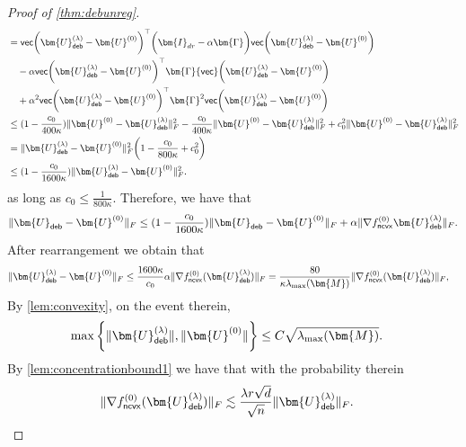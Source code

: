 \documentclass[10pt]{article}
\renewcommand{\t}{^{\top}}
\theoremstyle{definition}
\begin{document}
\begin{proof}[Proof of \cref{thm:debunreg}]
\begin{align}
    &= {\sf vec} \bigg( \bm{U}_{{\sf deb}}^{(\lambda)} - \bm{U}^{(0)} \bigg)\t \bigg( \bm{I}_{dr} - \alpha \bm{\Gamma} \bigg) {\sf vec}\bigg( \bm{U}_{{\sf deb}}^{(\lambda)} - \bm{U}^{(0)} \bigg) \\
    &\quad - \alpha {\sf vec} \bigg( \bm{U}_{{\sf deb}}^{(\lambda)} - \bm{U}^{(0)} \bigg)\t \bm{\Gamma} {\sf vec}\bigg( \bm{U}_{{\sf deb}}^{(\lambda)} - \bm{U}^{(0)} \bigg) \\
    &\quad + \alpha^2 {\sf vec} \bigg( \bm{U}_{{\sf deb}}^{(\lambda)} - \bm{U}^{(0)} \bigg)\t \bm{\Gamma}^2  {\sf vec}\bigg( \bm{U}_{{\sf deb}}^{(\lambda)} - \bm{U}^{(0)} \bigg) \\
    &\leq ( 1 - \frac{c_0}{400\kappa} ) \| \bm{U}^{(0)} - \bm{U}_{{\sf deb}}^{(\lambda)} \|_F^2 - \frac{c_0}{400\kappa}\|\bm{U}^{(0)} - \bm{U}_{{\sf deb}}^{(\lambda)} \|_F^2 + c_0^2 \|\bm{U}^{(0)} - \bm{U}_{{\sf deb}}^{(\lambda)} \|_F^2 \\
    &=  \| \bm{U}_{{\sf deb}}^{(\lambda)} - \bm{U}^{(0)} \|_F^2 \bigg( 1 - \frac{c_0}{800\kappa} + c_0^2 \bigg) \\
    &\leq (1 - \frac{c_0}{1600\kappa}) \| \bm{U}_{{\sf deb}}^{(\lambda)} - \bm{U}^{(0)} \|_F^2.
\end{align}
as long as $c_0 \leq \frac{1}{800 \kappa}$.  
Therefore, we have that
\begin{align}
    \| \bm{U}_{{\sf deb}} - \bm{U}^{(0)} \|_F \leq (1 - \frac{c_0}{1600\kappa})   \| \bm{U}_{{\sf deb}} - \bm{U}^{(0)} \|_F + \alpha \| \nabla f^{(0)}_{{\sf ncvx}} \bm{U}^{(\lambda)}_{{\sf deb}} \|_F.
\end{align}
After rearrangement we obtain that 
\begin{align}
    \| \bm{U}^{(\lambda)}_{{\sf deb}} - \bm{U}^{(0)} \|_F &\leq \frac{1600\kappa }{c_0} \alpha  \| \nabla f^{(0)}_{{\sf ncvx}}(\bm{U}^{(\lambda)}_{{\sf deb}}) \|_F = \frac{80}{\kappa \lambda_{\max}(\bm{M})} \| \nabla f^{(0)}_{{\sf ncvx}}(\bm{U}^{(\lambda)}_{{\sf deb}}) \|_F, \label{bebebe}
\end{align}
 By \cref{lem:convexity}, on the event therein,
\begin{align}
    \max\bigg\{\| \bm{U}^{(\lambda)}_{{\sf deb}} \|, \| \bm{U}^{(0)} \| \bigg\} &\leq C \sqrt{\lambda_{\max}(\bm{M})}. \label{blahblahboy2}
\end{align}
By \cref{lem:concentrationbound1} we have that with the probability therein
\begin{align}
      \| \nabla f^{(0)}_{{\sf ncvx}} (\bm{U}^{(\lambda)}_{{\sf deb}} ) \| _F &\lesssim  \frac{\lambda r \sqrt{d}}{\sqrt{n}} \| \bm{U}^{(\lambda)}_{{\sf deb}}  \|_F. \label{blahblahboy}

\end{align}
\end{proof}
\end{document}
